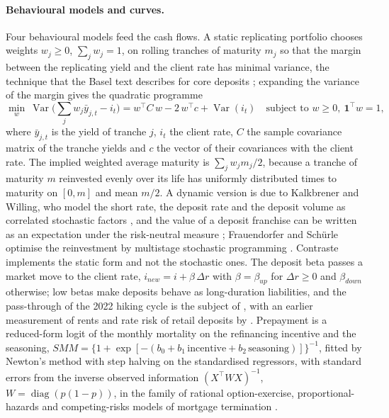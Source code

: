 \paragraph{Behavioural models and curves.}
Four behavioural models feed the cash flows. A static replicating portfolio chooses weights $w_j\ge 0$, $\sum_j w_j=1$, on rolling tranches of maturity $m_j$ so that the margin between the replicating yield and the client rate has minimal variance, the technique that the Basel text describes for core deposits \citep{alm:bcbs2016}; expanding the variance of the margin gives the quadratic programme
\begin{equation}
\min_{w}\ \operatorname{Var}\Big(\sum_j w_j\bar y_{j,t}-i_t\Big)=w^{\top}C\,w-2\,w^{\top}c+\operatorname{Var}(i_t)\quad\text{subject to }w\ge 0,\ \mathbf 1^{\top}w=1,
\label{eq:alm-replicating}
\end{equation}
where $\bar y_{j,t}$ is the yield of tranche $j$, $i_t$ the client rate, $C$ the sample covariance matrix of the tranche yields and $c$ the vector of their covariances with the client rate. The implied weighted average maturity is $\sum_j w_j m_j/2$, because a tranche of maturity $m$ reinvested evenly over its life has uniformly distributed times to maturity on $[0,m]$ and mean $m/2$. A dynamic version is due to Kalkbrener and Willing, who model the short rate, the deposit rate and the deposit volume as correlated stochastic factors \citep{alm:kalkbrener2004}, and the value of a deposit franchise can be written as an expectation under the risk-neutral measure \citep{alm:jarrow1998}; Frauendorfer and Sch\"urle optimise the reinvestment by multistage stochastic programming \citep{alm:frauendorfer2003}. Contraste implements the static form and not the stochastic ones. The deposit beta passes a market move to the client rate, $i_{new}=i+\beta\,\Delta r$ with $\beta=\beta_{up}$ for $\Delta r\ge 0$ and $\beta_{down}$ otherwise; low betas make deposits behave as long-duration liabilities, and the pass-through of the 2022 hiking cycle is the subject of \citet{alm:drechsler2021}, with an earlier measurement of rents and rate risk of retail deposits by \citet{alm:hutchison1996}. Prepayment is a reduced-form logit of the monthly mortality on the refinancing incentive and the seasoning, $SMM=\{1+\exp[-(b_0+b_1\,\text{incentive}+b_2\,\text{seasoning})]\}^{-1}$, fitted by Newton's method with step halving on the standardised regressors, with standard errors from the inverse observed information $(X^{\top}WX)^{-1}$, $W=\operatorname{diag}(p(1-p))$, in the family of rational option-exercise, proportional-hazards and competing-risks models of mortgage termination \citep{alm:stanton1995,alm:schwartz1989,provisions:deng2000}.

